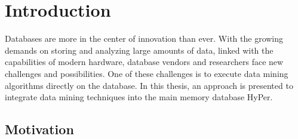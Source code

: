 \chapter{Introduction}\label{chapter:introduction}

Databases are more in the center of innovation than ever. With the growing demands on storing and analyzing large amounts of data, linked with the capabilities of modern hardware, database vendors and researchers face new challenges and possibilities. One of these challenges is to execute data mining algorithms directly on the database. In this thesis, an approach is presented to integrate data mining techniques into the main memory database HyPer.

\section{Motivation}

